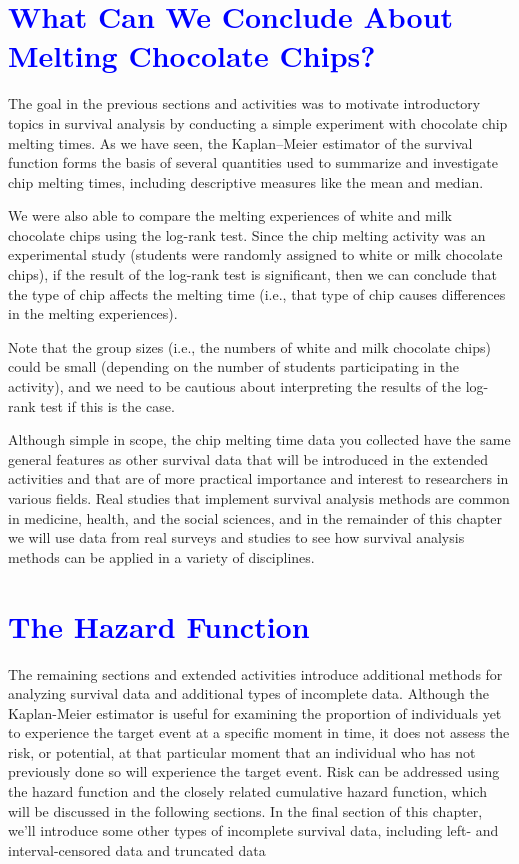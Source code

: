 \documentclass[
]{report}
\begin{document}
\hypertarget{section-83}{%
\section{\texorpdfstring{\textcolor{blue}{What Can We Conclude About Melting Chocolate Chips?}}{}}\label{section-83}}

The goal in the previous sections and activities was to motivate introductory topics in survival analysis by conducting a simple experiment with chocolate chip melting times. As we have seen, the Kaplan--Meier estimator of the survival function forms the basis of several quantities used to summarize and investigate chip melting times, including descriptive measures like the mean and median.

We were also able to compare the melting experiences of white and milk chocolate chips using the log-rank test. Since the chip melting activity was an experimental study (students were randomly assigned to white or milk chocolate chips), if the result of the log-rank test is significant, then we can conclude that the type of chip affects the melting time (i.e., that type of chip causes differences in the melting experiences).

Note that the group sizes (i.e., the numbers of white and milk chocolate chips) could be small (depending on the number of students participating in the activity), and we need to be cautious about interpreting the results of the log-rank test if this is the case.

Although simple in scope, the chip melting time data you collected have the same general features as other survival data that will be introduced in the extended activities and that are of more practical importance and interest to researchers in various fields. Real studies that implement survival analysis methods are common in medicine, health, and the social sciences, and in the remainder of this chapter we will use data from real surveys and studies to see how survival analysis methods can be applied in a variety of disciplines.

\hypertarget{section-84}{%
\section{\texorpdfstring{\textcolor{blue}{The Hazard Function}}{}}\label{section-84}}

The remaining sections and extended activities introduce additional methods for analyzing survival data and additional types of incomplete data. Although the Kaplan-Meier estimator is useful for examining the proportion of individuals yet to experience the target event at a specific moment in time, it does not assess the risk, or potential, at that particular moment that an individual who has not previously done so will experience the target event. Risk can be addressed using the hazard function and the closely related cumulative hazard function, which will be discussed in the following sections. In the final section of this chapter, we'll introduce some other types of incomplete survival data, including left- and interval-censored data and truncated data
\end{document}

